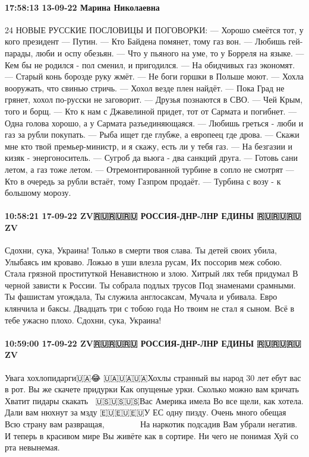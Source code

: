 \paragraph{17:58:13 13-09-22 Марина Николаевна}

24 НОВЫЕ РУССКИЕ ПОСЛОВИЦЫ И ПОГОВОРКИ:
— Хорошо смеётся тот, у кого президент — Путин.
— Кто Байдена помянет, тому газ вон.
— Любишь гей-парады, люби и оспу обезьян.
— Что у пьяного на уме, то у Борреля на языке.
— Кем бы не родился - пол сменил, и пригодился.
— На обидчивых газ экономят.
— Старый конь борозде руку жмёт.
— Не боги горшки в Польше моют.
— Хохла вооружать, что свинью стричь.
— Хохол везде плен найдёт.
— Пока Град не грянет, хохол по-русски не заговорит.
— Друзья познаются в СВО.
— Чей Крым, того и борщ.
— Кто к нам с Джавелиной придет, тот от Сармата и погибнет.
— Одна голова хорошо, а у Сармата разъединяющаяся.
— Любишь греться - люби и газ за рубли покупать.
— Рыба ищет где глубже, а европеец где дрова.
— Скажи мне кто твой премьер-министр, и я скажу, есть ли у тебя газ.
— На безгазии и кизяк - энергоноситель.
— Сугроб да вьюга - два санкций друга.
— Готовь сани летом, а газ тоже летом.
— Отремонтированной турбине в сопло не смотрят
— Кто в очередь за рубли встаёт, тому Газпром продаёт.
— Турбина с возу - к большому морозу.


\paragraph{10:58:21 17-09-22 ZV🇷🇺🇷🇺🇷🇺 РОССИЯ-ДНР-ЛНР ЕДИНЫ 🇷🇺🇷🇺🇷🇺ZV}

Сдохни, сука, Украина!
Только в смерти твоя слава.
Ты детей своих убила,
Улыбаясь им кроваво.
Ложью в уши влезла русам,
Их поссорив меж собою.
Стала грязной проституткой
Ненавистною и злою.
Хитрый лях тебя придумал
В черной зависти к России.
Ты собрала подлых трусов
Под знаменами срамными.
Ты фашистам угождала,
Ты служила англосаксам,
Мучала и убивала.
Евро клянчила и баксы.
Двадцать три с тобою года
Но твоим не стал я сыном.
Всё в тебе ужасно плохо.
Сдохни, сука, Украина!

\paragraph{10:59:00 17-09-22 ZV🇷🇺🇷🇺🇷🇺 РОССИЯ-ДНР-ЛНР ЕДИНЫ 🇷🇺🇷🇺🇷🇺ZV}

Увага хохлопидарги🇺🇦😂
🇺🇦🇺🇦🇺🇦Хохлы странный вы народ
30 лет ебут вас в рот.
Вы же скачете придурки
Как опущеные урки.
Сколько можно вам кричать
Хватит пидары скакать🏳‍🌈
🇺🇸🇺🇸🇺🇸Вас Америка имела
Во все щели, как хотела.
Дали вам нюхнут за мзду
🇪🇺🇪🇺🇪🇺У ЕС одну пизду.
Очень много обещая
Всю страну вам развращая, 🏳‍🌈🇺🇦🏳‍🌈🇺🇦🇺🇸🏳‍🌈😂
На наркотик подсадив
Вам убрали негатив.
И теперь в красивом мире
Вы живёте как в сортире.
Ни чего не понимая
Хуй со рта невынемая.
🏳‍🌈🇺🇦🇺🇸🏳‍🌈🇺🇦🏳‍🌈🇺🇸😂😂😂

